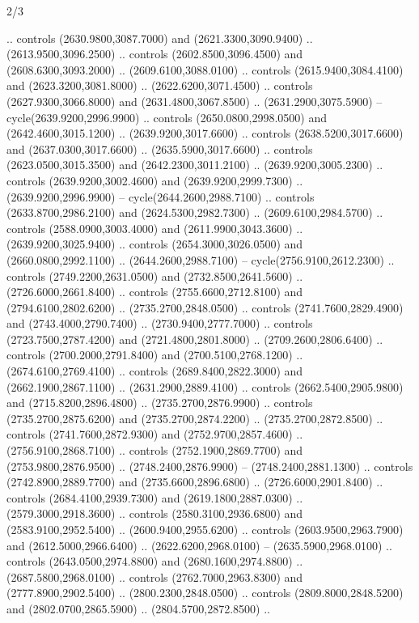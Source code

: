 \begin{flagdescription}{2/3}
\begin{scope}[shift={(0.5\flaglength,0.5)},scale=\flagwidth/130]
\begin{scope}[y=0.01mm, x=0.01mm,shift={(-3365,-2250)}]
  .. controls (2630.9800,3087.7000) and (2621.3300,3090.9400) ..
  (2613.9500,3096.2500) .. controls (2602.8500,3096.4500) and
  (2608.6300,3093.2000) .. (2609.6100,3088.0100) .. controls
  (2615.9400,3084.4100) and (2623.3200,3081.8000) .. (2622.6200,3071.4500) ..
  controls (2627.9300,3066.8000) and (2631.4800,3067.8500) ..
  (2631.2900,3075.5900) -- cycle(2639.9200,2996.9900) .. controls
  (2650.0800,2998.0500) and (2642.4600,3015.1200) .. (2639.9200,3017.6600) ..
  controls (2638.5200,3017.6600) and (2637.0300,3017.6600) ..
  (2635.5900,3017.6600) .. controls (2623.0500,3015.3500) and
  (2642.2300,3011.2100) .. (2639.9200,3005.2300) .. controls
  (2639.9200,3002.4600) and (2639.9200,2999.7300) .. (2639.9200,2996.9900) --
  cycle(2644.2600,2988.7100) .. controls (2633.8700,2986.2100) and
  (2624.5300,2982.7300) .. (2609.6100,2984.5700) .. controls
  (2588.0900,3003.4000) and (2611.9900,3043.3600) .. (2639.9200,3025.9400) ..
  controls (2654.3000,3026.0500) and (2660.0800,2992.1100) ..
  (2644.2600,2988.7100) -- cycle(2756.9100,2612.2300) .. controls
  (2749.2200,2631.0500) and (2732.8500,2641.5600) .. (2726.6000,2661.8400) ..
  controls (2755.6600,2712.8100) and (2794.6100,2802.6200) ..
  (2735.2700,2848.0500) .. controls (2741.7600,2829.4900) and
  (2743.4000,2790.7400) .. (2730.9400,2777.7000) .. controls
  (2723.7500,2787.4200) and (2721.4800,2801.8000) .. (2709.2600,2806.6400) ..
  controls (2700.2000,2791.8400) and (2700.5100,2768.1200) ..
  (2674.6100,2769.4100) .. controls (2689.8400,2822.3000) and
  (2662.1900,2867.1100) .. (2631.2900,2889.4100) .. controls
  (2662.5400,2905.9800) and (2715.8200,2896.4800) .. (2735.2700,2876.9900) ..
  controls (2735.2700,2875.6200) and (2735.2700,2874.2200) ..
  (2735.2700,2872.8500) .. controls (2741.7600,2872.9300) and
  (2752.9700,2857.4600) .. (2756.9100,2868.7100) .. controls
  (2752.1900,2869.7700) and (2753.9800,2876.9500) .. (2748.2400,2876.9900) --
  (2748.2400,2881.1300) .. controls (2742.8900,2889.7700) and
  (2735.6600,2896.6800) .. (2726.6000,2901.8400) .. controls
  (2684.4100,2939.7300) and (2619.1800,2887.0300) .. (2579.3000,2918.3600) ..
  controls (2580.3100,2936.6800) and (2583.9100,2952.5400) ..
  (2600.9400,2955.6200) .. controls (2603.9500,2963.7900) and
  (2612.5000,2966.6400) .. (2622.6200,2968.0100) -- (2635.5900,2968.0100) ..
  controls (2643.0500,2974.8800) and (2680.1600,2974.8800) ..
  (2687.5800,2968.0100) .. controls (2762.7000,2963.8300) and
  (2777.8900,2902.5400) .. (2800.2300,2848.0500) .. controls
  (2809.8000,2848.5200) and (2802.0700,2865.5900) .. (2804.5700,2872.8500) ..

\end{scope}
\end{scope}
\end{flagdescription}

